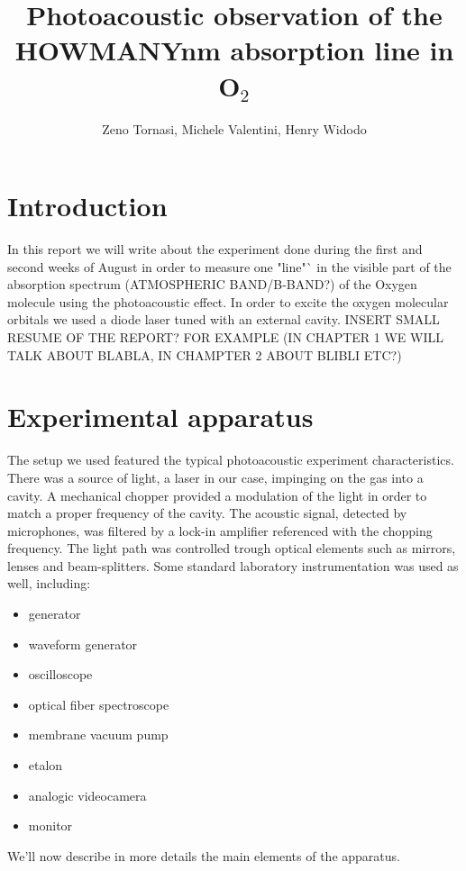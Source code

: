 \documentclass[a4paper, 11pt]{article}
\title{Photoacoustic observation of the HOWMANYnm absorption line in O$_2$}
\author{Zeno Tornasi, Michele Valentini, Henry Widodo}
\begin{document}
\maketitle\newpage

\tableofcontents\newpage

\section*{Introduction}

In this report we will write about the experiment done during the first and second weeks of August in order to measure one "line"` in the visible part of the absorption spectrum (ATMOSPHERIC BAND/B-BAND?) of the Oxygen molecule using the photoacoustic effect. In order to excite the oxygen molecular orbitals we used a diode laser tuned with an external cavity. INSERT SMALL RESUME OF THE REPORT? FOR EXAMPLE (IN CHAPTER 1 WE WILL TALK ABOUT BLABLA, IN CHAMPTER 2 ABOUT BLIBLI ETC?)

\newpage
\section{Experimental apparatus}
The setup we used featured the typical photoacoustic experiment characteristics. There was a source of light, a laser in our case, impinging on the gas into a cavity. A mechanical chopper provided a modulation of the light in order to match a proper frequency of the cavity. The acoustic signal, detected by microphones, was filtered by a lock-in amplifier referenced with the chopping frequency. The light path was controlled trough optical elements such as mirrors, lenses and beam-splitters. Some standard laboratory instrumentation was used as well, including:
\begin{itemize}
\item generator \item waveform generator \item oscilloscope \item optical fiber spectroscope \item membrane vacuum pump \item etalon \item analogic videocamera \item monitor
\end{itemize}
 We'll now describe in more details the main elements of the apparatus.
\end{document}
